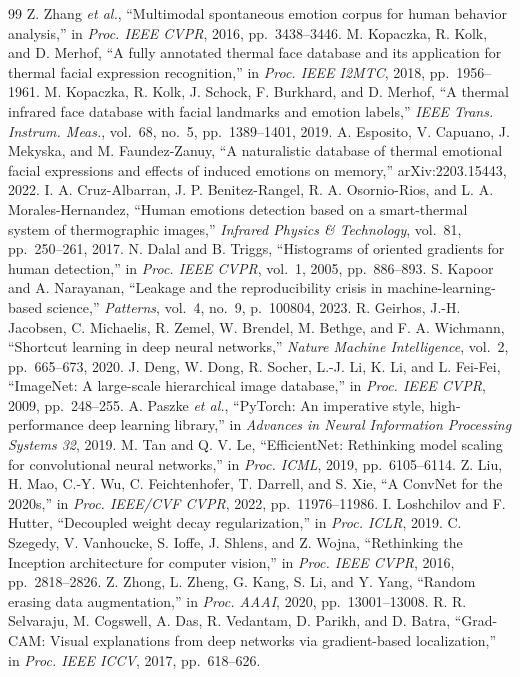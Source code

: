 \documentclass[10pt,twocolumn,letterpaper]{article}
\begin{document}
\begin{thebibliography}{99}
 Z. Zhang \emph{et al.}, ``Multimodal spontaneous emotion corpus for human behavior analysis,'' in \emph{Proc. IEEE CVPR}, 2016, pp.~3438--3446.
 M. Kopaczka, R. Kolk, and D. Merhof, ``A fully annotated thermal face database and its application for thermal facial expression recognition,'' in \emph{Proc. IEEE I2MTC}, 2018, pp.~1956--1961.
 M. Kopaczka, R. Kolk, J. Schock, F. Burkhard, and D. Merhof, ``A thermal infrared face database with facial landmarks and emotion labels,'' \emph{IEEE Trans. Instrum. Meas.}, vol.~68, no.~5, pp.~1389--1401, 2019.
 A. Esposito, V. Capuano, J. Mekyska, and M. Faundez-Zanuy, ``A naturalistic database of thermal emotional facial expressions and effects of induced emotions on memory,'' arXiv:2203.15443, 2022.
 I. A. Cruz-Albarran, J. P. Benitez-Rangel, R. A. Osornio-Rios, and L. A. Morales-Hernandez, ``Human emotions detection based on a smart-thermal system of thermographic images,'' \emph{Infrared Physics \& Technology}, vol.~81, pp.~250--261, 2017.
 N. Dalal and B. Triggs, ``Histograms of oriented gradients for human detection,'' in \emph{Proc. IEEE CVPR}, vol.~1, 2005, pp.~886--893.
 S. Kapoor and A. Narayanan, ``Leakage and the reproducibility crisis in machine-learning-based science,'' \emph{Patterns}, vol.~4, no.~9, p.~100804, 2023.
 R. Geirhos, J.-H. Jacobsen, C. Michaelis, R. Zemel, W. Brendel, M. Bethge, and F. A. Wichmann, ``Shortcut learning in deep neural networks,'' \emph{Nature Machine Intelligence}, vol.~2, pp.~665--673, 2020.
 J. Deng, W. Dong, R. Socher, L.-J. Li, K. Li, and L. Fei-Fei, ``ImageNet: A large-scale hierarchical image database,'' in \emph{Proc. IEEE CVPR}, 2009, pp.~248--255.
 A. Paszke \emph{et al.}, ``PyTorch: An imperative style, high-performance deep learning library,'' in \emph{Advances in Neural Information Processing Systems 32}, 2019.
 M. Tan and Q. V. Le, ``EfficientNet: Rethinking model scaling for convolutional neural networks,'' in \emph{Proc. ICML}, 2019, pp.~6105--6114.
 Z. Liu, H. Mao, C.-Y. Wu, C. Feichtenhofer, T. Darrell, and S. Xie, ``A ConvNet for the 2020s,'' in \emph{Proc. IEEE/CVF CVPR}, 2022, pp.~11976--11986.
 I. Loshchilov and F. Hutter, ``Decoupled weight decay regularization,'' in \emph{Proc. ICLR}, 2019.
 C. Szegedy, V. Vanhoucke, S. Ioffe, J. Shlens, and Z. Wojna, ``Rethinking the Inception architecture for computer vision,'' in \emph{Proc. IEEE CVPR}, 2016, pp.~2818--2826.
 Z. Zhong, L. Zheng, G. Kang, S. Li, and Y. Yang, ``Random erasing data augmentation,'' in \emph{Proc. AAAI}, 2020, pp.~13001--13008.
 R. R. Selvaraju, M. Cogswell, A. Das, R. Vedantam, D. Parikh, and D. Batra, ``Grad-CAM: Visual explanations from deep networks via gradient-based localization,'' in \emph{Proc. IEEE ICCV}, 2017, pp.~618--626.
\end{thebibliography}
\end{document}
